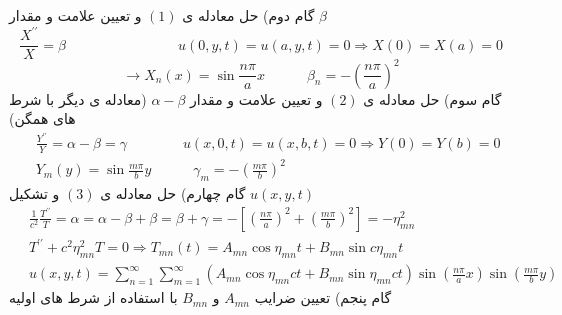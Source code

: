 گام دوم) حل معادله ی
$(1)$
و تعیین علامت و مقدار 
$\beta$
\[
\frac{X^{\prime \prime}}{X}=\beta  \quad\quad \quad  \quad \quad \quad \quad \quad u(0,y,t)=u(a,y,t)=0 \Rightarrow X(0)=X(a)=0
\]
\[
\rightarrow X_{n}(x)=\sin\frac{n \pi }{a}x \quad\quad\quad \beta_{n}=-(\frac{n \pi }{a})^{2}
\]
گام سوم) حل معادله ی 
$(2)$
و تعیین علامت و مقدار 
$\alpha-\beta$
(معادله ی دیگر با شرط های همگن)
\begin{equation*}
	\begin{aligned}
		{} &\
		\frac{Y^{\prime \prime}}{Y}=\alpha-\beta=\gamma     \quad \quad \quad \quad u(x,0,t)=u(x,b,t)=0 \Rightarrow Y(0)=Y(b)=0
		\\ &\
		Y_{m}(y)=\sin\frac{m \pi }{b}y \quad\quad\quad \gamma_{m}=-(\frac{m \pi }{b})^{2}
	\end{aligned}
\end{equation*}
گام چهارم) حل معادله ی
$(3)$
و تشکیل
$u(x,y,t)$
\begin{equation*}
	\begin{aligned}
		{} &\
		\frac{1}{c^{2}}\frac {T^{\prime\prime}}{T}=\alpha=\alpha-\beta+\beta=\beta+\gamma=-\left[\left(\frac{n \pi}{a}\right)^2+\left(\frac{m \pi}{b}\right)^2\right]=-\eta^{2}_{mn}
		\\ &\
		T^{\prime\prime}+c^{2}\eta^{2}_{mn}T=0 \Rightarrow T_{mn}(t)=A_{mn}\cos\eta_{mn}t+B_{mn} \sin c\eta_{mn}t
		\\ &\
		u(x,y,t)=\sum_{n=1}^{\infty}\sum_{m=1}^{\infty}\left(A_{mn} \cos\eta_{mn}ct+B_{mn} \sin \eta_{mn}ct\right) \sin \left(\frac{n \pi}{a}x\right) \sin\left( \frac{m \pi}{b}y\right)
	\end{aligned}
\end{equation*}
گام پنجم) تعیین ضرایب
$A_{mn}$
و
$B_{mn}$
با استفاده از شرط های اولیه
